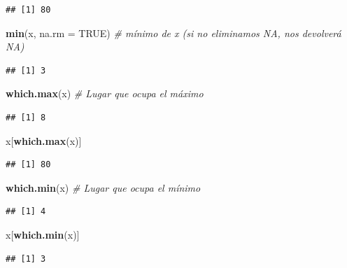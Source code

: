 \documentclass[11pt,]{book}
\newenvironment{Shaded}{\begin{snugshade}}{\end{snugshade}}
\newcommand{\CommentTok}[1]{\textcolor[rgb]{0.37,0.37,0.37}{\textit{#1}}}
\newcommand{\DataTypeTok}[1]{\textcolor[rgb]{0.27,0.27,0.27}{#1}}
\newcommand{\KeywordTok}[1]{\textcolor[rgb]{0.27,0.27,0.27}{\textbf{#1}}}
\newcommand{\NormalTok}[1]{#1}
\newcommand{\OtherTok}[1]{\textcolor[rgb]{0.37,0.37,0.37}{#1}}
\begin{document}
\begin{verbatim}
## [1] 80
\end{verbatim}

\begin{Shaded}
\begin{Highlighting}[]
\KeywordTok{min}\NormalTok{(x, }\DataTypeTok{na.rm =} \OtherTok{TRUE}\NormalTok{) }\CommentTok{# mínimo de x (si no eliminamos NA, nos devolverá NA)}
\end{Highlighting}
\end{Shaded}

\begin{verbatim}
## [1] 3
\end{verbatim}

\begin{Shaded}
\begin{Highlighting}[]
\KeywordTok{which.max}\NormalTok{(x) }\CommentTok{# Lugar que ocupa el máximo}
\end{Highlighting}
\end{Shaded}

\begin{verbatim}
## [1] 8
\end{verbatim}

\begin{Shaded}
\begin{Highlighting}[]
\NormalTok{x[}\KeywordTok{which.max}\NormalTok{(x)]}
\end{Highlighting}
\end{Shaded}

\begin{verbatim}
## [1] 80
\end{verbatim}

\begin{Shaded}
\begin{Highlighting}[]
\KeywordTok{which.min}\NormalTok{(x) }\CommentTok{# Lugar que ocupa el mínimo}
\end{Highlighting}
\end{Shaded}

\begin{verbatim}
## [1] 4
\end{verbatim}

\begin{Shaded}
\begin{Highlighting}[]
\NormalTok{x[}\KeywordTok{which.min}\NormalTok{(x)]}
\end{Highlighting}
\end{Shaded}

\begin{verbatim}
## [1] 3
\end{verbatim}
\end{document}
